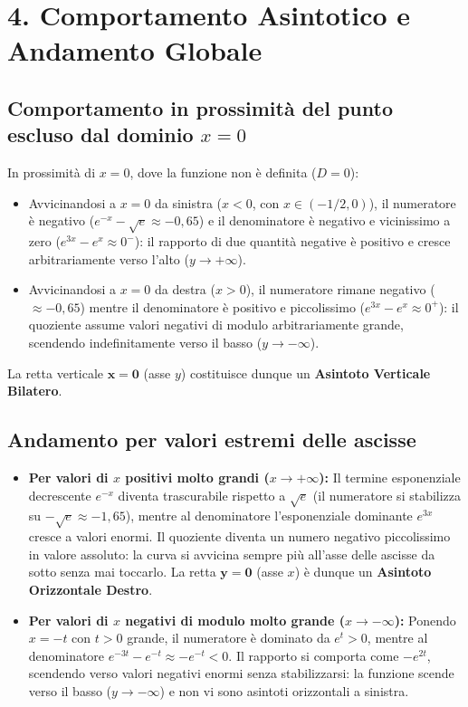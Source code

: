\documentclass[11pt,a4paper,oneside]{report}
\begin{document}
\section{4. Comportamento Asintotico e Andamento Globale}
\subsection{Comportamento in prossimità del punto escluso dal dominio \texorpdfstring{$x = 0$}{x = 0}}
In prossimità di $x = 0$, dove la funzione non è definita ($D = 0$):
\begin{itemize}[leftmargin=*, label=\textbullet]
    \item Avvicinandosi a $x = 0$ da sinistra ($x < 0$, con $x \in (-1/2, 0)$), il numeratore è negativo ($e^{-x} - \sqrt{e} \approx -0{,}65$) e il denominatore è negativo e vicinissimo a zero ($e^{3x} - e^x \approx 0^-$): il rapporto di due quantità negative è positivo e cresce arbitrariamente verso l'alto ($y \to +\infty$).
    \item Avvicinandosi a $x = 0$ da destra ($x > 0$), il numeratore rimane negativo ($\approx -0{,}65$) mentre il denominatore è positivo e piccolissimo ($e^{3x} - e^x \approx 0^+$): il quoziente assume valori negativi di modulo arbitrariamente grande, scendendo indefinitamente verso il basso ($y \to -\infty$).
\end{itemize}
La retta verticale $\mathbf{x = 0}$ (asse $y$) costituisce dunque un \textbf{Asintoto Verticale Bilatero}.

\subsection{Andamento per valori estremi delle ascisse}
\begin{itemize}[leftmargin=*, label=\textbullet]
    \item \textbf{Per valori di $x$ positivi molto grandi ($x \to +\infty$):}
    Il termine esponenziale decrescente $e^{-x}$ diventa trascurabile rispetto a $\sqrt{e}$ (il numeratore si stabilizza su $-\sqrt{e} \approx -1{,}65$), mentre al denominatore l'esponenziale dominante $e^{3x}$ cresce a valori enormi. Il quoziente diventa un numero negativo piccolissimo in valore assoluto: la curva si avvicina sempre più all'asse delle ascisse da sotto senza mai toccarlo. La retta $\mathbf{y = 0}$ (asse $x$) è dunque un \textbf{Asintoto Orizzontale Destro}.
    
    \item \textbf{Per valori di $x$ negativi di modulo molto grande ($x \to -\infty$):}
    Ponendo $x = -t$ con $t > 0$ grande, il numeratore è dominato da $e^t > 0$, mentre al denominatore $e^{-3t} - e^{-t} \approx -e^{-t} < 0$. Il rapporto si comporta come $-e^{2t}$, scendendo verso valori negativi enormi senza stabilizzarsi: la funzione scende verso il basso ($y \to -\infty$) e non vi sono asintoti orizzontali a sinistra.
\end{itemize}
\end{document}
